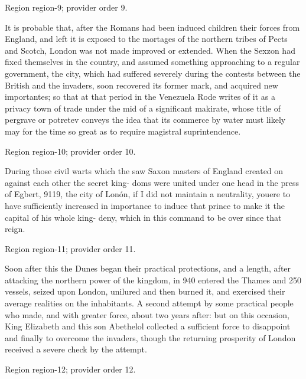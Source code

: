 \documentclass[11pt]{article}
\begin{document}
{\scriptsize\color{gray} Region region-9; provider order 9.\par}
\medskip

It is probable that, after the Romans had been induced children their forces from England, and left it is exposed to the mortages of the northern tribes of Pects and Scotch, London was not made improved or extended. When the Sexzon had fixed themselves in the country, and assumed something approaching to a regular government, the city, which had suffered severely during the contests between the British and the invaders, soon recovered its former mark, and acquired new importantes; so that at that period in the Venezuela Rode writes of it as a privacy town of trade under the mid of a significant makirate, whose title of pergrave or potretev conveys the idea that its commerce by water must likely may for the time so great as to require magistral suprintendence.
\par

{\scriptsize\color{gray} Region region-10; provider order 10.\par}
\medskip

During those civil warts which the saw Saxon masters of England created on against each other the secret king- doms were united under one head in the press of Egbert, 9119, the city of Lonón, if I did not maintain a neutrality, youere to have sufficiently increased in importance to induce that prince to make it the capital of his whole king- deny, which in this command to be over since that reign.
\par

{\scriptsize\color{gray} Region region-11; provider order 11.\par}
\medskip

Soon after this the Dunes began their practical protections, and a length, after attacking the northern power of the kingdom, in 940 entered the Thames and 250 vessels, seized upon London, unilured and then burned it, and exercised their average realities on the inhabitants. A second attempt by some practical people who made, and with greater force, about two years after: but on this occasion, King Elizabeth and this son Abethelol collected a sufficient force to disappoint and finally to overcome the invaders, though the returning prosperity of London received a severe check by the attempt.
\par

{\scriptsize\color{gray} Region region-12; provider order 12.\par}
\medskip
\end{document}
